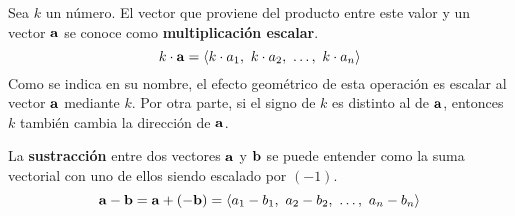 \documentclass[12pt]{article}
\begin{document}
Sea $k$ un número. El vector que proviene del producto entre este valor y un vector $\mathbf{a}$ se conoce como \textbf{multiplicación escalar}.
\[
  k \cdot \mathbf{a} = \langle k \cdot a_{1}, \ k \cdot a_{2}, \ \ldots, \ k \cdot a_{n} \rangle
\]
Como se indica en su nombre, el efecto geométrico de esta operación es escalar al vector $\mathbf{a}$ mediante $k$. Por otra parte, si el signo de $k$ es distinto al de $\mathbf{a}$, entonces $k$ también cambia la dirección de $\mathbf{a}$.

\begin{figure}[hbt!]
\centering


\end{figure}

La \textbf{sustracción} entre dos vectores $\mathbf{a}$ y $\mathbf{b}$ se puede entender como la suma vectorial con uno de ellos siendo escalado por $(-1)$.
\[
  \vecmat{a} - \vecmat{b} = \vecmat{a} + (-\vecmat{b}) = \langle a_{1} - b_{1}, \ a_{2} - b_{2}, \ \ldots, \ a_{n} - b_{n} \rangle
\]

\newpage

\begin{figure}[hbt!]
\centering


\end{figure}
\end{document}
